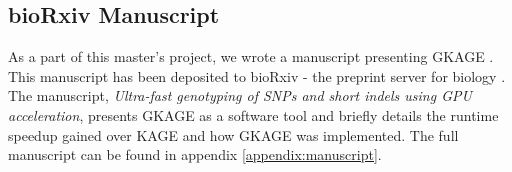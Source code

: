 \subsection{bioRxiv Manuscript}
As a part of this master's project, we wrote a manuscript presenting GKAGE \cite{manuscript}.
This manuscript has been deposited to bioRxiv - the preprint server for biology \cite{biorxiv}.
The manuscript, \textit{Ultra-fast genotyping of SNPs and short indels using GPU acceleration}, presents GKAGE as a software tool and briefly details the runtime speedup gained over KAGE and how GKAGE was implemented.
The full manuscript can be found in appendix \ref{appendix:manuscript}.
